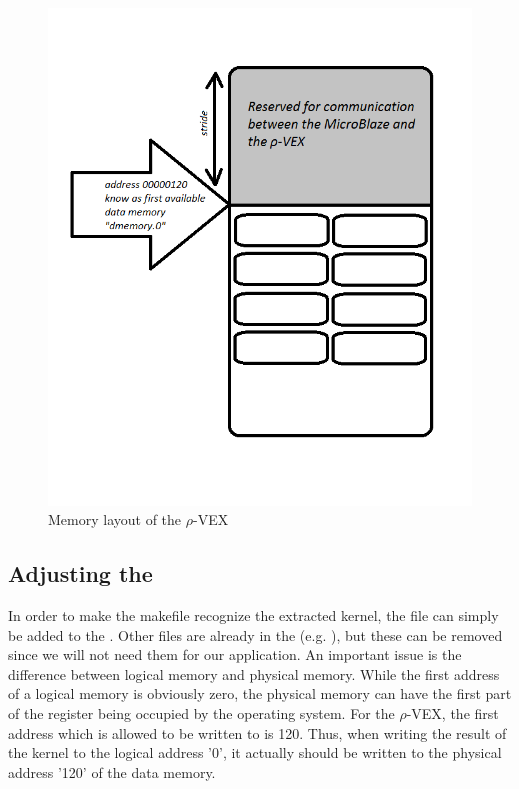 \begin{figure}%
\includegraphics[width=\columnwidth]{Pictures/dmem_rvex}%
\caption{Memory layout of the $\rho$-VEX}%
\label{fig:rvex-dmem}%
\end{figure}

\subsection{Adjusting the }

In order to make the makefile recognize the extracted kernel, the file can simply be added to the . Other files are already in the  (e.g. ), but these can be removed since we will not need them for our application. An important issue is the difference between logical memory and physical memory. While the first address of a logical memory is obviously zero, the physical memory can have the first part of the register being occupied by the operating system. For the $\rho$-VEX, the first address which is allowed to be written to is 120. Thus, when writing the result of the kernel to the logical address '0', it actually should be written to the physical address '120' of the data memory. %

